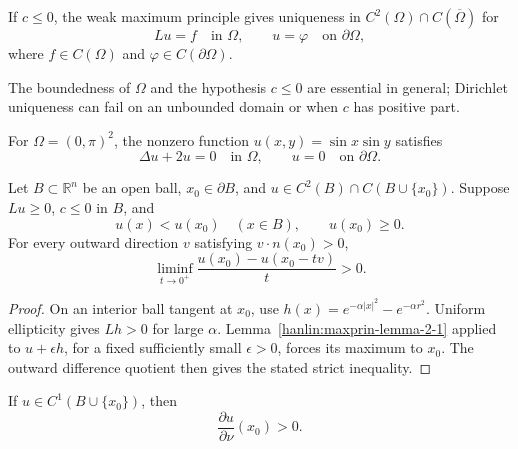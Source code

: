 If $c\le0$, the weak maximum principle gives uniqueness in
$C^2(\Omega)\cap C(\overline\Omega)$ for
\[
Lu=f\quad\text{in }\Omega,
\qquad
u=\varphi\quad\text{on }\partial\Omega,
\]
where $f\in C(\Omega)$ and $\varphi\in C(\partial\Omega)$.

\begin{remark}\label{hanlin:maxprin-remark-2-4}
The boundedness of $\Omega$ and the hypothesis $c\le0$ are essential in general;
Dirichlet uniqueness can fail on an unbounded domain or when $c$ has positive
part.
\end{remark}

\begin{example}\label{hanlin:maxprin-example-2-5}
For $\Omega=(0,\pi)^2$, the nonzero function $u(x,y)=\sin x\sin y$ satisfies
\[
\Delta u+2u=0\quad\text{in }\Omega,
\qquad
u=0\quad\text{on }\partial\Omega.
\]
\end{example}

\begin{theorem}\label{hanlin:maxprin-theorem-2-6}
Let $B\subset\mathbb{R}^n$ be an open ball, $x_0\in\partial B$, and
$u\in C^2(B)\cap C(B\cup\{x_0\})$. Suppose $Lu\ge0$, $c\le0$ in $B$, and
\[
u(x)<u(x_0)\quad(x\in B),
\qquad u(x_0)\ge0.
\]
For every outward direction $v$ satisfying $v\cdot n(x_0)>0$,
\[
\liminf_{t\to0^+}\frac{u(x_0)-u(x_0-tv)}{t}>0.
\]
\end{theorem}
\begin{proof}
\sketch On an interior ball tangent at $x_0$, use
$h(x)=e^{-\alpha|x|^2}-e^{-\alpha r^2}$. Uniform ellipticity gives $Lh>0$
for large $\alpha$. Lemma~\ref{hanlin:maxprin-lemma-2-1} applied to
$u+\epsilon h$, for a fixed sufficiently small $\epsilon>0$, forces its maximum
to $x_0$. The outward difference quotient then gives the stated strict
inequality.
\end{proof}
\begin{remark}\label{hanlin:maxprin-remark-2-7}
If $u\in C^1(B\cup\{x_0\})$, then
\[
\frac{\partial u}{\partial \nu}(x_0) > 0.
\]
\end{remark}

